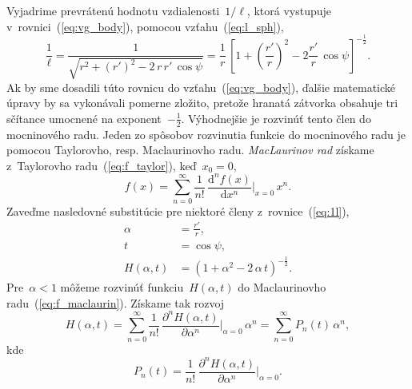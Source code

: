\documentclass[a4paper, 12pt]{book}
\newcommand{\diff}{\mathrm d}
\begin{document}
Vyjadrime prevrátenú hodnotu vzdialenosti~$1 \slash \ell$, ktorá vystupuje 
v~rovnici~(\ref{eq:vg_body}), pomocou vzťahu~(\ref{eq:l_sph}),
%
\begin{equation}
\label{eq:1l}
\frac{1}{\ell} = \frac{1}{\sqrt{ r^2 + (r')^2 - 2 \, r \, r' \, \cos\psi
}} = \frac{1}{r} \, \left[1 + \left( \dfrac{r'}{r}
\right)^2 - 2 \dfrac{r'}{r} \, \cos\psi \right]^{-\frac{1}{2}}{.}
\end{equation}
%
Ak by sme dosadili túto rovnicu do vzťahu~(\ref{eq:vg_body}), ďalšie 
matematické úpravy by sa vykonávali pomerne zložito, pretože hranatá zátvorka 
obsahuje tri sčítance umocnené na exponent~$-\frac{1}{2}$.  Výhodnejšie je 
rozvinúť tento člen do mocninového radu.  Jeden zo spôsobov rozvinutia funkcie 
do mocninového radu je pomocou Taylorovho, resp. Maclaurinovho radu.  
\emph{MacLaurinov rad} získame z~Taylorovho radu~(\ref{eq:f_taylor}), keď~$x_0 
= 0$,
%
\begin{equation}
\label{eq:f_maclaurin}
f(x) = \sum_{n = 0}^\infty \frac{1}{n!} \, \frac{\diff^n f(x)}{\diff x^n} 
\bigg\lvert_{x = 0} \, x^n{.}
\end{equation}
%
Zaveďme nasledovné substitúcie pre niektoré členy z~rovnice~(\ref{eq:1l}),
%
\begin{align}
\label{eq:alpha}
\alpha &= \frac{r'}{r}{,}\\
%
\label{eq:t}
t &= \cos\psi{,}\\
%
\label{eq:generic_function_for_lps}
H(\alpha, t) &= \left(1 + \alpha^2 - 2 \, \alpha\, t \right)^{-\frac{1}{2}}{.}
\end{align}
%
Pre~$\alpha < 1$ môžeme rozvinúť funkciu~$H(\alpha, t)$ do Maclaurinovho 
radu~(\ref{eq:f_maclaurin}).  Získame tak rozvoj
%
\begin{equation}
\label{eq:maclaurin_series_of_generic_function}
H(\alpha, t) = \sum_{n = 0}^\infty \frac{1}{n!} \, \frac{\partial^n H(\alpha,
t)}{\partial \alpha^n} \bigg\lvert_{\alpha = 0} \, \alpha^n = \sum_{n 
= 0}^\infty P_n(t) \, \alpha^n{,}
\end{equation}
%
kde
%
\begin{equation}
\label{eq:pn}
P_n(t) = \frac{1}{n!} \, \frac{\partial^n H(\alpha, t)}{\partial \alpha^n} 
\bigg\lvert_{\alpha = 0}{.}
\end{equation}
\end{document}
